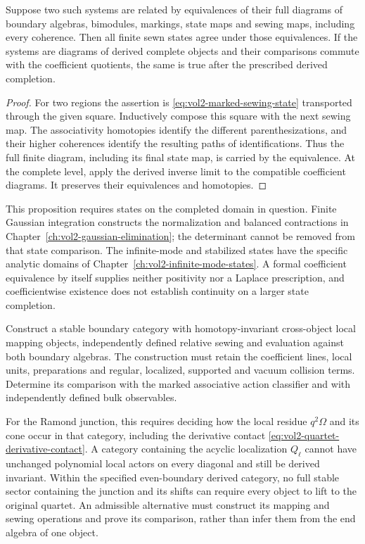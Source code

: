 \begin{proposition}\label{prop:vol2-sewing-transport}
Suppose two such systems are related by equivalences of
their full diagrams of boundary algebras, bimodules,
markings, state maps and sewing maps, including every
coherence. Then all finite sewn states agree under those
equivalences. If the systems are diagrams of derived
complete objects and their comparisons commute with the
coefficient quotients, the same is true after the prescribed
derived completion.
\end{proposition}
\begin{proof}
For two regions the assertion is
\eqref{eq:vol2-marked-sewing-state} transported through
the given square. Inductively compose this square with
the next sewing map. The associativity homotopies identify
the different parenthesizations, and their higher
coherences identify the resulting paths of identifications.
Thus the full finite diagram, including its final state
map, is carried by the equivalence. At the complete level,
apply the derived inverse limit to the compatible
coefficient diagrams. It preserves their equivalences
and homotopies.
\end{proof}

This proposition requires states on the completed domain in
question. Finite Gaussian integration constructs the
normalization and balanced contractions in
Chapter~\ref{ch:vol2-gaussian-elimination}; the determinant
cannot be removed from that state comparison.
The infinite-mode and stabilized states have the specific
analytic domains of
Chapter~\ref{ch:vol2-infinite-mode-states}.
A formal coefficient equivalence by itself supplies
neither positivity nor a Laplace prescription, and
coefficientwise existence does not establish continuity
on a larger state completion.

\begin{problem}
\label{prob:vol2-marked-physical-reconstruction}
Construct a stable boundary category with homotopy-invariant
cross-object local mapping objects, independently defined
relative sewing and evaluation against both boundary
algebras. The construction must retain the coefficient
lines, local units, preparations and regular, localized,
supported and vacuum collision terms. Determine its
comparison with the marked associative action classifier
and with independently defined bulk observables.

For the Ramond junction, this requires deciding how the
local residue \(q^2\Omega\) and its cone occur in that
category, including the derivative contact
\eqref{eq:vol2-quartet-derivative-contact}.
A category containing the acyclic localization \(Q_\ell\)
cannot have unchanged polynomial local actors on every
diagonal and still be derived invariant. Within the
specified even-boundary derived category, no full stable
sector containing the junction and its shifts can require
every object to lift to the original quartet.
An admissible alternative must construct its mapping and
sewing operations and prove its comparison, rather than
infer them from the end algebra of one object.
\end{problem}

